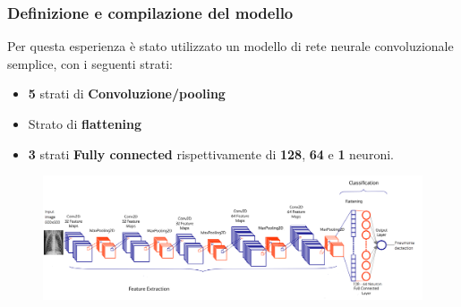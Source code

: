 \documentclass{beamer}
\begin{document}
\begin{frame}
	\frametitle{Definizione e compilazione del modello}
	Per questa esperienza è stato utilizzato un modello di rete neurale convoluzionale 
    semplice, con i seguenti strati:
	\begin{itemize}
		\item \textbf{5} strati di \textbf{Convoluzione/pooling}
		\item Strato di \textbf{flattening}
		\item \textbf{3} strati \textbf{Fully connected} rispettivamente di \textbf{128}, \textbf{64} e \textbf{1} neuroni.
	\end{itemize}

	\begin{figure}
		\includegraphics[width=1\textwidth]{pneumonia model.png}
	\end{figure}
		
	
\end{frame}
\end{document}
